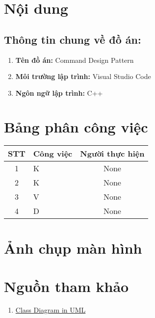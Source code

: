 \documentclass[a4paper,12pt]{report}
\begin{document}
\pagebreak
\section{Nội dung}
\subsection{Thông tin chung về đồ án:}
\begin{enumerate}
  \item \textbf{Tên đồ án:} Command Design Pattern
  \item \textbf{Môi trường lập trình:} Visual Studio Code
  \item \textbf{Ngôn ngữ lập trình:} C++
\end{enumerate}

\section{Bảng phân công việc}
\begin{center}
  \renewcommand{\arraystretch}{1.5}
  \begin{tabular}{|c|p{}|c|}
    \hline
    \textbf{STT} & \textbf{Công việc} & \textbf{Người thực hiện} \\\hline
    1            & K                  & None                     \\\hline
    2            & K                  & None                     \\\hline
    3            & V                  & None                     \\\hline
    4            & D                  & None                     \\\hline
  \end{tabular}
\end{center}

\pagebreak
\section{Ảnh chụp màn hình}

\pagebreak
\section{Nguồn tham khảo}
\begin{enumerate}
  \item \href{https://www.youtube.com/watch?v=oBykLn64AUc}{Class Diagram in UML}
\end{enumerate}
\end{document}
